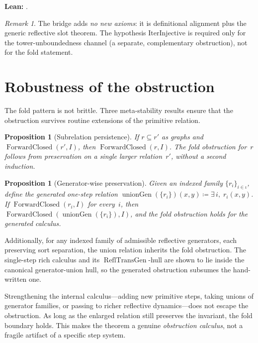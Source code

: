 \documentclass[11pt]{article}
\theoremstyle{plain}
\newtheorem{proposition}[theorem]{Proposition}
\theoremstyle{definition}
\theoremstyle{remark}
\newtheorem{remark}[theorem]{Remark}
\newcommand{\ReflTransGen}{\operatorname{ReflTransGen}}
\newcommand{\ForwardClosed}{\operatorname{ForwardClosed}}
\newcommand{\unionGen}{\operatorname{unionGen}}
\begin{document}
\noindent\textbf{Lean:}
.

\begin{remark}
The bridge adds \emph{no new axioms}: it is definitional alignment plus the generic
reflective slot theorem.  The hypothesis $\mathrm{IterInjective}$ is required only for
the tower-unboundedness channel (a separate, complementary obstruction), not for the
fold statement.
\end{remark}

\section{Robustness of the obstruction}\label{sec:robustness}

The fold pattern is not brittle.  Three meta-stability results ensure that the
obstruction survives routine extensions of the primitive relation.

\begin{proposition}[Subrelation persistence]\label{prop:subrelation}
If $r \subseteq r'$ as graphs and $\ForwardClosed(r', I)$, then $\ForwardClosed(r, I)$.
The fold obstruction for~$r$ follows from preservation on a single larger
relation~$r'$, without a second induction.
\end{proposition}

\begin{proposition}[Generator-wise preservation]\label{prop:generator}
Given an indexed family $\{r_i\}_{i \in \iota}$, define the generated one-step relation
$\unionGen(\{r_i\})(x,y) \coloneqq \exists\, i,\; r_i(x,y)$.  If
$\ForwardClosed(r_i, I)$ for every~$i$, then $\ForwardClosed(\unionGen(\{r_i\}), I)$,
and the fold obstruction holds for the generated calculus.
\end{proposition}

\noindent Additionally, for any indexed family of admissible reflective generators,
each preserving sort separation, the union relation inherits the fold obstruction.  The
single-step rich calculus and its $\ReflTransGen$-hull are shown to lie inside the
canonical generator-union hull, so the generated obstruction subsumes the hand-written
one.

\begin{keybox}[title={The obstruction is stable}]
Strengthening the internal calculus---adding new primitive steps, taking unions of
generator families, or passing to richer reflective dynamics---does not escape the
obstruction.  As long as the enlarged relation still preserves the invariant, the fold
boundary holds.  This makes the theorem a genuine \emph{obstruction calculus}, not a
fragile artifact of a specific step system.
\end{keybox}
\end{document}

